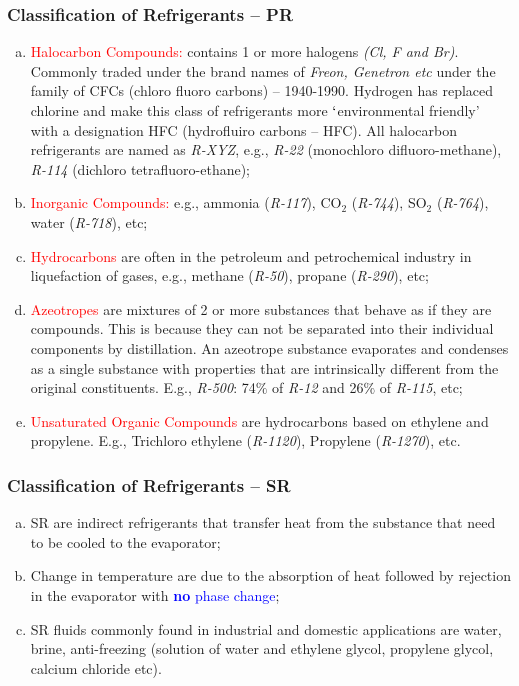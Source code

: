 \documentclass[10pt,compress]{beamer}
\begin{document}
\begin{frame}
 \frametitle{Classification of Refrigerants -- PR}
 \begin{enumerate}[(a)]
   \item <1-> \textcolor{red}{Halocarbon Compounds:} contains 1 or more halogens {\it (Cl, F and Br)}. Commonly traded under the brand names of {\it Freon, Genetron etc} under the family of CFCs (chloro fluoro carbons) -- 1940-1990. Hydrogen has replaced chlorine and make this class of refrigerants more $\lq$environmental friendly' with a designation HFC (hydrofluiro carbons -- HFC). All halocarbon refrigerants are named as {\it R-XYZ}, e.g., {\it R-22} (monochloro difluoro-methane), {\it R-114} (dichloro tetrafluoro-ethane); 
   \item <2-> \textcolor{red}{Inorganic Compounds:} e.g., ammonia ({\it R-117}), CO$_{2}$ ({\it R-744}), SO$_{2}$ ({\it R-764}), water ({\it R-718}), etc;
   \item <3-> \textcolor{red}{Hydrocarbons} are often in the petroleum and petrochemical industry in liquefaction of gases, e.g., methane ({\it R-50}), propane ({\it R-290}), etc;
   \item <4-> \textcolor{red}{Azeotropes} are mixtures of 2 or more substances that behave as if they are compounds. This is because they can not be separated into their individual components by distillation. An azeotrope substance evaporates and condenses as a single substance with properties that are intrinsically different from the original constituents. E.g., {\it R-500}: 74$\%$ of {\it R-12} and 26$\%$ of {\it R-115}, etc;
   \item <5-> \textcolor{red}{Unsaturated Organic Compounds} are hydrocarbons based on ethylene and propylene. E.g., Trichloro ethylene ({\it R-1120}), Propylene ({\it R-1270}), etc.
 \end{enumerate}
\end{frame}

\begin{frame}
 \frametitle{Classification of Refrigerants -- SR}
 \begin{enumerate}[(a)]
   \item <1-> SR are indirect refrigerants that transfer heat from the substance that need to be cooled to the evaporator; 
   \item <2-> Change in temperature are due to the absorption of heat followed by rejection in the evaporator with \textcolor{blue}{{\bf no} phase change};
   \item <3-> SR fluids commonly found in industrial and domestic applications are water, brine, anti-freezing (solution of water and ethylene glycol, propylene glycol, calcium chloride etc).
 \end{enumerate}
\end{frame}
\end{document}
